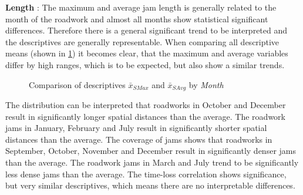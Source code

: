 \textbf{Length} : The maximum and average jam length is generally related to the month of the roadwork and almost all months show statistical significant differences. Therefore there is a general significant trend to be interpreted and the descriptives are generally representable. When comparing all descriptive means (shown in \cref{fig:arbis_matched_meancomparison_month_spatial}) it becomes clear, that the maximum and average variables differ by high ranges, which is to be expected, but also show a similar trends.
\begin{figure}[ht!]
	\data
	\pgfplotstablesort[sort key=means, sort cmp=float >]{\datasorted}{\data}
	\tiny
	\centering
	\caption{Comparison of descriptives $\bar{x}_{SMax}$ and $\bar{x}_{SAvg}$ by \textit{Month}}
	\label{fig:arbis_matched_meancomparison_month_spatial}
\end{figure}
The distribution can be interpreted that roadworks in October and December result in significantly longer spatial distances than the average. The roadwork jams in January, February and July result in significantly shorter spatial distances than the average. The coverage of jams shows that roadworks in September, October, November and December result in significantly denser jams than the average. The roadwork jams in March and July trend to be significantly less dense jams than the average. The time-loss correlation shows significance, but very similar descriptives, which means there are no interpretable differences.

